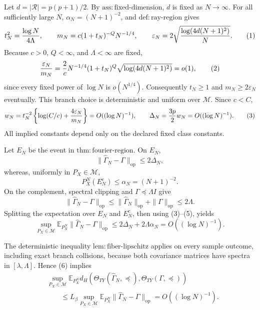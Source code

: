 Let \(d=|\mathcal R|=p(p+1)/2\).  By \(\mathrm{ass:fixed\text{-}dimension}\), \(d\) is fixed as \(N\to\infty\).  For all sufficiently large \(N\), \(\alpha_N=(N+1)^{-2}\), and \(\mathrm{def:ray\text{-}region}\) gives
\[
 t_N^2={\log N\over4\Lambda},\qquad
 m_N=c(1+t_N)^{-Q}N^{-1/4},\qquad
 \varepsilon_N=2\sqrt{{\log(4d(N+1)^2)\over N}}. \tag{1}
\]
Because \(c>0\), \(Q<\infty\), and \(\Lambda<\infty\) are fixed,
\[
 {\varepsilon_N\over m_N}
 ={2\over c}N^{-1/4}(1+t_N)^Q
 \sqrt{\log(4d(N+1)^2)}=o(1), \tag{2}
\]
since every fixed power of \(\log N\) is \(o(N^{1/4})\).  Consequently \(t_N\ge1\) and \(m_N\ge2\varepsilon_N\) eventually.  This branch choice is deterministic and uniform over \(\mathcal M\).  Since \(c<C\),
\[
 w_N=t_N^{-2}\left\{\log(C/c)+{4\varepsilon_N\over m_N}\right\}
 =O((\log N)^{-1}),
 \qquad
 \Delta_N={3p\over2}w_N=O((\log N)^{-1}). \tag{3}
\]
All implied constants depend only on the declared fixed class constants.

Let \(E_N\) be the event in \(\mathrm{thm:fourier\text{-}region}\).  On \(E_N\),
\[
 \|\widehat\Gamma_N-\Gamma\|_{\mathrm{op}}\le2\Delta_N,
\]
whereas, uniformly in \(P_X\in\mathcal M\),
\[
 P_X^N(E_N^c)\le\alpha_N=(N+1)^{-2}. \tag{4}
\]
On the complement, spectral clipping and \(\Gamma\preceq\Lambda I\) give
\[
 \|\widehat\Gamma_N-\Gamma\|_{\mathrm{op}}
 \le\|\widehat\Gamma_N\|_{\mathrm{op}}+\|\Gamma\|_{\mathrm{op}}
 \le2\Lambda. \tag{5}
\]
Splitting the expectation over \(E_N\) and \(E_N^c\), then using (3)--(5), yields
\[
 \sup_{P_X\in\mathcal M}
 \mathbb E_{P_X^N}\|\widehat\Gamma_N-\Gamma\|_{\mathrm{op}}
 \le2\Delta_N+2\Lambda\alpha_N
 =O((\log N)^{-1}). \tag{6}
\]

The deterministic inequality \(\mathrm{lem:fiber\text{-}lipschitz}\) applies on every sample outcome, including exact branch collisions, because both covariance matrices have spectra in \([\lambda,\Lambda]\).  Hence (6) implies
\[
 \begin{aligned}
 &\sup_{P_X\in\mathcal M}\mathbb E_{P_X^N}
 d_H\!\left(\Theta_{TY}(\widehat\Gamma_N,\preceq),
              \Theta_{TY}(\Gamma,\preceq)\right)\\
 &\qquad\le L_\beta\sup_{P_X\in\mathcal M}
 \mathbb E_{P_X^N}\|\widehat\Gamma_N-\Gamma\|_{\mathrm{op}}
 =O((\log N)^{-1}).
 \end{aligned} \tag{7}
\]

